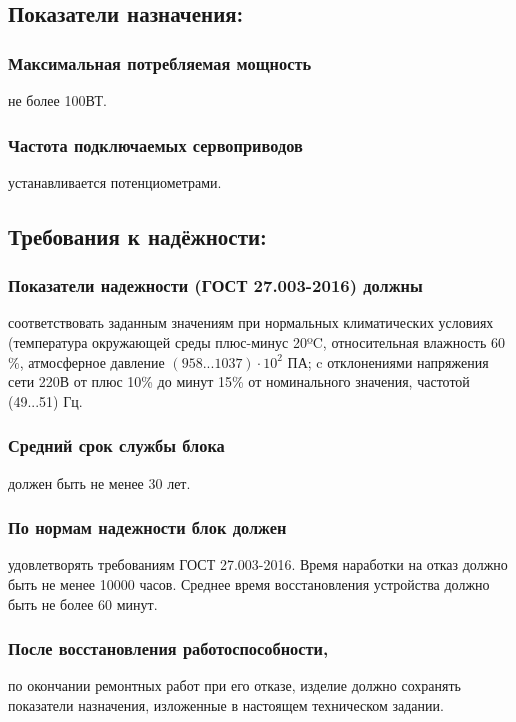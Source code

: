 \documentclass[a4paper]{bsuir-tor}
\begin{document}
\subsection{Показатели назначения:}

\subsubsection{Максимальная потребляемая мощность}
не более 100ВТ.


\subsubsection{Частота подключаемых сервоприводов } устанавливается
потенциометрами.


\subsection{Требования к надёжности: }
\subsubsection{Показатели надежности (ГОСТ 27.003-2016) должны}
соответствовать заданным значениям при нормальных климатических
условиях (температура окружающей среды плюс-минус 20ºC, относительная
влажность 60 \%, атмосферное давление $(958...1037) \cdot  10^2$ ПА;
c отклонениями напряжения сети 220В от плюс 10\% до минут 15\%
от номинального значения, частотой (49...51) Гц.

\subsubsection{Средний срок службы блока }
 должен быть не менее 30 лет.

 \subsubsection{ По нормам надежности блок должен }
 удовлетворять требованиям ГОСТ 27.003-2016. Время наработки на отказ
 должно быть не менее 10000 часов. Среднее время восстановления
 устройства должно быть не более 60 минут.
 
 \subsubsection{После восстановления работоспособности, }
 по окончании ремонтных работ при его отказе, изделие
 должно сохранять показатели назначения, изложенные в настоящем
 техническом задании.
\end{document}
